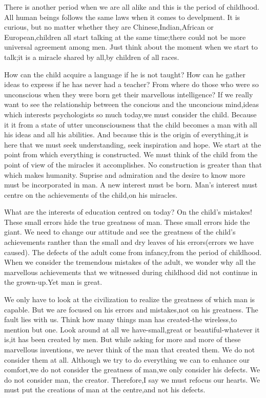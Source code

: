 \documentclass[lang=cn,10pt]{elegantbook}
\begin{document}
There is another period when we are all alike and this is the period of childhood. All human beings follows the same laws when it comes to develpment. It is curious, but no matter whether they are Chinese,Indian,African or European,children all start talking at the same time;there could not be more universal agreement among men. Just think about the moment when we start to talk;it is a miracle shared by all,by children of all races.

How can the child acquire a language if he is not taught? How can he gather ideas to express if he has never had a teacher? From where do those who were so unconscious when they were born get their marvellous intelligence? If we really want to see the relationship between the concious and the unconcious mind,ideas which interests psychologists so much today,we must consider the child. Because it it from a state of utter unconsciousness that the child becomes a man with all his ideas and all his abilities. And because this is the origin of everything,it is here that we must seek understanding, seek inspiration and hope. We start at the point from which everything is constructed. We must think of the child from the point of view of the miracles it accomplishes. No construction is greater than that which makes humanity. Suprise and admiration and the desire to know more must be incorporated in man. A new interest must be born. Man's interest must centre on the achievements of the child,on his miracles.

What are the interests of education centred on today? On the child's mistakes! These small errors hide the true greatness of man. These small errors hide the giant. We need to change our attitude and see the greatness of the child's achievements ranther than the small and dry leaves of his errors(errors we have caused). The defects of the adult come from infancy,from the period of childhood. When we consider the tremendous mistakes of the adult, we wonder why all the marvellous achievements that we witnessed during childhood did not continue in the grown-up.Yet man is great.

We only have to look at the civilization to realize the greatness of which man is capable. But we are focused on his errors and mistakes,not on his greatness. The fault lies with us. Think how many things man has created-the wireless,to mention but one. Look around at all we have-small,great or beautiful-whatever it is,it has been created by men. But while asking for more and more of these marvellous inventions, we never think of the man that created them. We do not consider them at all. Although we try to do everything we can to enhance our comfort,we do not consider the greatness of man,we only consider his defects. We do not consider man, the creator. Therefore,I say we must refocus our hearts. We must put the creations of man at the centre,and not his defects.
\end{document}
